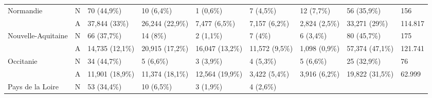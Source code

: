 \begin{table}[h!]
{\begin{tabular}{|l|l|l|l|l|l|l|l|l|}
            Normandie                                         & N               & 70 (44,9\%)                                 & 10 (6,4\%)      & 1 (0,6\%)        & 7 (4,5\%)      & 12
            (7,7\%)                                           & 56 (35,9\%)     & 156                                                                                                                    \\
            ~                                                 & A               & 37,844 (33\%)                               & 26,244 (22,9\%) & 7,477 (6,5\%)    & 7,157 (6,2\%)
                                                              & 2,824 (2,5\%)   & 33,271 (29\%)                               & 114.817                                                                  \\ \hline
            Nouvelle-Aquitaine                                & N               & 66 (37,7\%)                                 & 14 (8\%)        & 2 (1,1\%)        & 7 (4\%)        &
            6 (3,4\%)                                         & 80 (45,7\%)     & 175                                                                                                                    \\
            ~                                                 & A               & 14,735 (12,1\%)                             & 20,915 (17,2\%) & 16,047 (13,2\%)  & 11,572
            (9,5\%)                                           & 1,098 (0,9\%)   & 57,374 (47,1\%)                             & 121.741                                                                  \\ \hline
            Occitanie                                         & N               & 34 (44,7\%)                                 & 5 (6,6\%)       & 3 (3,9\%)        & 4 (5,3\%)      & 5
            (6,6\%)                                           & 25 (32,9\%)     & 76                                                                                                                     \\
            ~                                                 & A               & 11,901 (18,9\%)                             & 11,374 (18,1\%) & 12,564 (19,9\%)  & 3,422
            (5,4\%)                                           & 3,916 (6,2\%)   & 19,822 (31,5\%)                             & 62.999                                                                   \\ \hline
            Pays de la Loire                                  & N               & 53 (34,4\%)                                 & 10 (6,5\%)      & 3 (1,9\%)        & 4 (2,6\%)

\end{tabular}}
\end{table}
